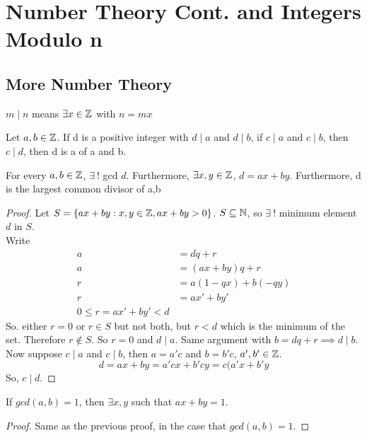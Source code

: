 \documentclass[openany]{report}
\begin{document}
\chapter{Number Theory Cont. and Integers Modulo n}
\section{More Number Theory}
\begin{definition}
    $m \mid n$ means $\exists x \in \mathbb{Z}$ with $n = mx$
\end{definition}
\begin{definition}
    Let $a,b \in \mathbb{Z}$. If d is a positive integer with $d \mid a$ and $d \mid b$, if $c \mid a$ and $c \mid b$, then $c \mid d$, then d is a  of a and b.
\end{definition}
\begin{theorem}
    For every $a,b \in \mathbb{Z}$, $\exists \ !$ gcd $d$. Furthermore, $\exists x,y \in \mathbb{Z}$, $d = ax + by$. Furthermore, d is the largest common divisor of a,b
\end{theorem}
\begin{proof}
    Let $S = \{ ax + by : x,y \in \mathbb{Z}, ax + by > 0\}$. $S \subseteq \mathbb{N}$, so $\exists \ !$ minimum element $d$ in $S$.\\
    Write
    \begin{align*}
        a &= dq + r\tag{$0 \leq r < d$}\\
        a &= (ax + by)q + r\tag{some $x,y \in \ints$}\\
        r &= a(1-qx) + b(-qy)\\
        r &= ax' + by'\tag{$x' = 1-qx$, $y' = -qy$}\\
        0 \leq r = ax' + by' < d
    \end{align*}
    So. either $r = 0$ or $r \in S$ but not both, but $r < d$ which is the minimum of the set. Therefore $r \not\in S$. So $r = 0$ and $d \mid a$. Same argument with $b = dq + r \implies d \mid b$.\\
    Now suppose $c \mid a$ and $c \mid b$, then $a = a'c$ and $b = b'c$, $a',b' \in \mathbb{Z}$.
    $$d = ax + by = a'cx + b'cy = c(a'x + b'y$$
    So, $c \mid d$.
\end{proof}
\begin{corollary}
If $gcd(a,b) = 1$, then $\exists x,y$ such that $ax + by = 1$.
\end{corollary}
\begin{proof}
    Same as the previous proof, in the case that $gcd(a,b) = 1$.
\end{proof}
\end{document}
